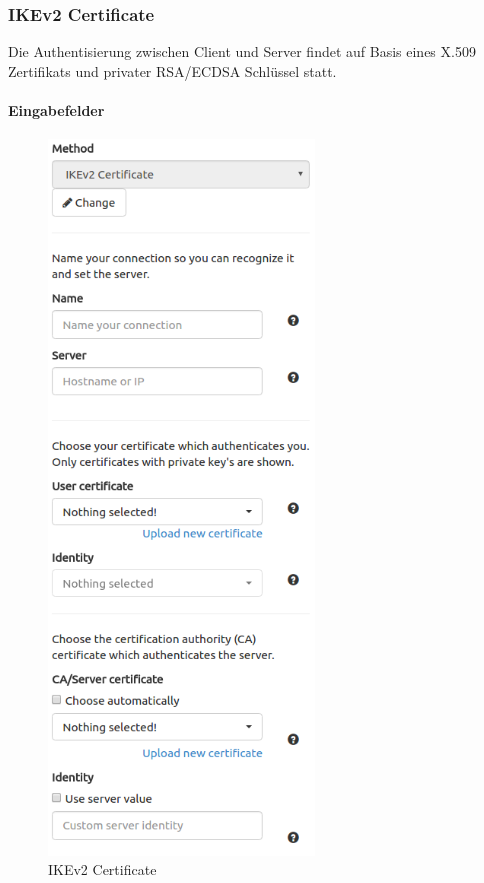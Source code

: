 \subsubsection{IKEv2 Certificate}
Die Authentisierung zwischen Client und Server findet auf Basis eines X.509 Zertifikats und privater RSA/ECDSA Schlüssel statt.\\
\noindent\begin{minipage}[t]{0.5\textwidth}
\vspace{0pt}
\paragraph{Eingabefelder}\mbox{}\medskip
    \begin{figure}[H]
    	\centering
    	\includegraphics[width=200pt]{images/ike_cert.png}
    	\caption{IKEv2 Certificate}
    \end{figure}
\end{minipage}
